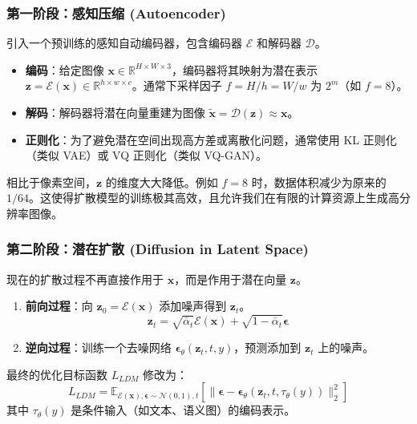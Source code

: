 \documentclass[zihao=-4, fontset=windows]{ctexart}
\begin{document}
\subsubsection{第一阶段：感知压缩 (Autoencoder)}
引入一个预训练的感知自动编码器，包含编码器 $\mathcal{E}$ 和解码器 $\mathcal{D}$。
\begin{itemize}
    \item \textbf{编码}：给定图像 $\mathbf{x} \in \mathbb{R}^{H \times W \times 3}$，编码器将其映射为潜在表示 $\mathbf{z} = \mathcal{E}(\mathbf{x}) \in \mathbb{R}^{h \times w \times c}$。通常下采样因子 $f = H/h = W/w$ 为 $2^m$（如 $f=8$）。
    \item \textbf{解码}：解码器将潜在向量重建为图像 $\tilde{\mathbf{x}} = \mathcal{D}(\mathbf{z}) \approx \mathbf{x}$。
    \item \textbf{正则化}：为了避免潜在空间出现高方差或离散化问题，通常使用 KL 正则化（类似 VAE）或 VQ 正则化（类似 VQ-GAN）。
\end{itemize}

\begin{note}[优势]
相比于像素空间，$\mathbf{z}$ 的维度大大降低。例如 $f=8$ 时，数据体积减少为原来的 $1/64$。这使得扩散模型的训练极其高效，且允许我们在有限的计算资源上生成高分辨率图像。
\end{note}

\subsubsection{第二阶段：潜在扩散 (Diffusion in Latent Space)}
现在的扩散过程不再直接作用于 $\mathbf{x}$，而是作用于潜在向量 $\mathbf{z}$。
\begin{enumerate}
    \item \textbf{前向过程}：向 $\mathbf{z}_0 = \mathcal{E}(\mathbf{x})$ 添加噪声得到 $\mathbf{z}_t$。
    \begin{equation}
        \mathbf{z}_t = \sqrt{\bar{\alpha}_t}\mathcal{E}(\mathbf{x}) + \sqrt{1-\bar{\alpha}_t}\boldsymbol{\epsilon}
    \end{equation}
    \item \textbf{逆向过程}：训练一个去噪网络 $\boldsymbol{\epsilon}_\theta(\mathbf{z}_t, t, y)$，预测添加到 $\mathbf{z}_t$ 上的噪声。
\end{enumerate}

最终的优化目标函数 $L_{LDM}$ 修改为：
\begin{equation}
    L_{LDM} = \mathbb{E}_{\mathcal{E}(\mathbf{x}), \boldsymbol{\epsilon} \sim \mathcal{N}(0,1), t} \left[ \| \boldsymbol{\epsilon} - \boldsymbol{\epsilon}_\theta(\mathbf{z}_t, t, \tau_\theta(y)) \|_2^2 \right]
\end{equation}
其中 $\tau_\theta(y)$ 是条件输入（如文本、语义图）的编码表示。
\end{document}
